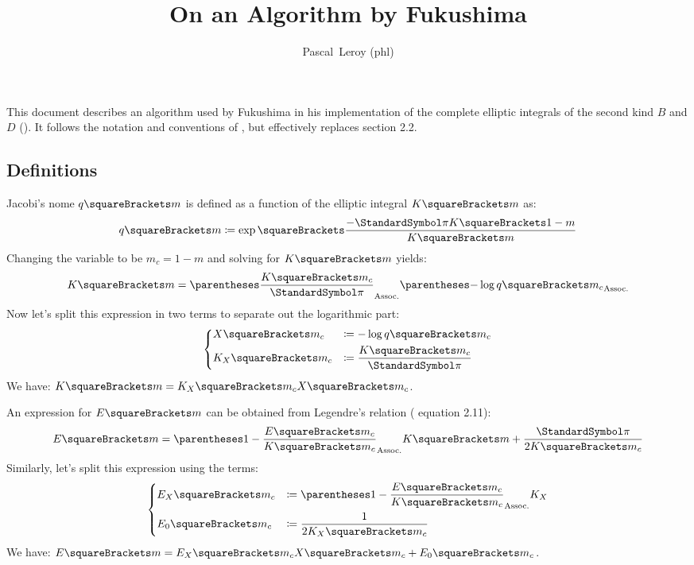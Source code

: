 \documentclass[10pt, a4paper, twoside]{basestyle}
\title{On an Algorithm by Fukushima}
\date{\printdate{2019-08-05}}
\author{Pascal~Leroy (phl)}
\begin{document}
\maketitle
\begin{sloppypar}
\noindent
This document describes an algorithm used by Fukushima in his implementation of the complete elliptic integrals of the second kind $B$ and $D$ (\cite{Fukushima2018}).  It
follows the notation and conventions of \cite{Fukushima2011a}, but effectively replaces section 2.2.
\end{sloppypar}

\subsection*{Definitions}
Jacobi's nome $q\of{m}$ is defined as a function of the elliptic integral $K\of{m}$ as:
\[
q\of{m} \DefineAs\exp\of{\frac{-\Pi K\of{1 - m}}{K\of{m}}}
\]
Changing the variable to be $m_c = 1 - m$ and solving for $K\of{m}$ yields:
\[
K\of{m} = \pa{\frac{K\of{m_c}}{\Pi}}\pa{-\log q\of{m_c}}
\]
Now let's split this expression in two terms to separate out the logarithmic part:
\[
\begin{dcases}
X\of{m_c} &\DefineAs -\log q\of{m_c}\\
K_X\of{m_c} &\DefineAs \frac{K\of{m_c}}{\Pi}
\end{dcases}
\]
We have: $K\of{m} = K_X\of{m_c} X\of{m_c}$.

An expression for $E\of{m}$ can be obtained from Legendre's relation (\cite{Fukushima2011a} equation 2.11):
\[
E\of{m} = \pa{1 - \frac{E\of{m_c}}{K\of{m_c}}} K\of{m} + \frac{\Pi}{2 K\of{m_c}}
\]
Similarly, let's split this expression using the terms:
\[
\begin{dcases}
E_X\of{m_c} &\DefineAs \pa{1 - \frac{E\of{m_c}}{K\of{m_c}}}K_X\\
E_0\of{m_c} &\DefineAs \frac{1}{2 K_X\of{m_c}}
\end{dcases}
\]
We have: $E\of{m} = E_X\of{m_c} X\of{m_c} + E_0\of{m_c}$.
\end{document}
